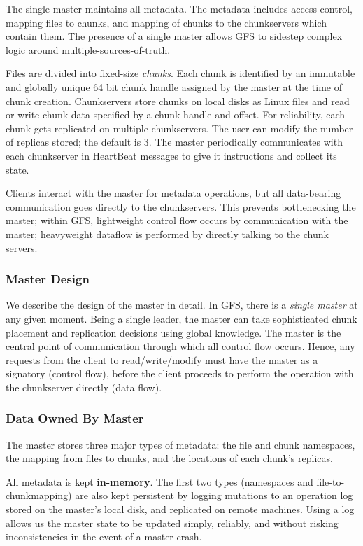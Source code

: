 \documentclass{article}
\begin{document}
The single master maintains all metadata. The metadata includes access control, mapping files to chunks, and mapping of chunks to the chunkservers which contain them.  The presence of a single master allows GFS to sidestep complex logic around multiple-sources-of-truth. 

Files are divided into fixed-size \emph{chunks}. Each chunk is identified by an immutable and globally unique 64 bit chunk handle assigned by the master at the time of chunk creation.  Chunkservers store chunks on local disks as Linux files and read or write chunk data specified by a chunk handle and offset. For reliability, each chunk gets replicated on multiple chunkservers. The user can modify the number of replicas stored; the default is 3. The master periodically communicates with each chunkserver in HeartBeat messages to give it instructions and collect its state.


Clients interact with the master for metadata operations, but all data-bearing communication goes directly to the chunkservers. This prevents bottlenecking the master; within GFS, lightweight control flow occurs by communication with the master; heavyweight dataflow is performed by directly talking to the chunk servers.

\subsubsection{Master Design}

We describe the design of the master in detail. In GFS, there is a \emph{single master} at any given moment. Being a single leader, the
master can take sophisticated chunk placement and replication decisions using global knowledge. The master is the central
point of communication through which all control flow occurs. Hence, any requests from the client
to read/write/modify must have the master as a signatory (control flow), before the client proceeds to perform the operation
with the chunkserver directly (data flow).

\subsubsection{Data Owned By Master}
The master stores three major types of metadata: the file and chunk namespaces, the mapping from files to chunks, and the locations of each chunk’s replicas.

All metadata is kept \textbf{in-memory}. The first two types (namespaces and file-to-chunkmapping) are also kept persistent by logging mutations to an operation log stored on the master’s local disk, and replicated on remote machines. Using a log allows us the master state to be updated simply, reliably, and without risking inconsistencies in the event of a master crash. 
\end{document}
